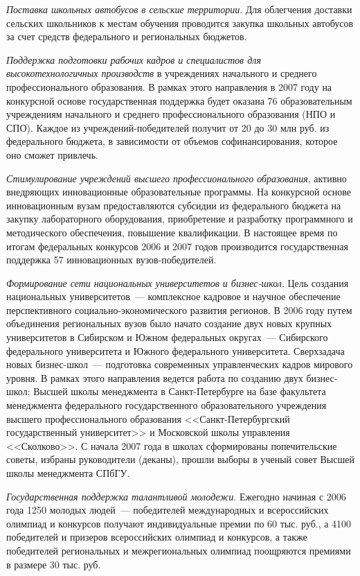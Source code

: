 \documentclass[article, 12pt, russian, oneside]{ncc}
\begin{document}
\emph{Поставка школьных автобусов в сельские территории}. Для
облегчения доставки сельских школьников к местам обучения проводится
закупка школьных автобусов за счет средств федерального и региональных
бюджетов.

\emph{Поддержка подготовки рабочих кадров и специалистов для
  высокотехнологичных производств} в учреждениях начального и среднего
профессионального образования. В рамках этого направления в 2007 году
на конкурсной основе государственная поддержка будет оказана 76
образовательным учреждениям начального и среднего профессионального
образования (НПО и СПО). Каждое из учреждений-победителей получит от
20 до 30 млн руб. из федерального бюджета, в зависимости от объемов
софинансирования, которое оно сможет привлечь.

\emph{Стимулирование учреждений высшего профессионального
  образования}, активно внедряющих инновационные образовательные
программы. На конкурсной основе инновационным вузам предоставляются
субсидии из федерального бюджета на закупку лабораторного
оборудования, приобретение и разработку программного и методического
обеспечения, повышение квалификации. В настоящее время по итогам
федеральных конкурсов 2006 и 2007 годов производится государственная
поддержка 57 инновационных вузов-победителей.

\emph{Формирование сети национальных университетов и
  бизнес-школ}. Цель создания национальных университетов~---
комплексное кадровое и научное обеспечение перспективного
социально-экономического развития регионов. В 2006 году путем
объединения региональных вузов было начато создание двух новых крупных
университетов в Сибирском и Южном федеральных округах~--- Сибирского
федерального университета и Южного федерального
университета. Сверхзадача новых бизнес-школ~--- подготовка современных
управленческих кадров мирового уровня. В рамках этого направления
ведется работа по созданию двух бизнес-школ: Высшей школы менеджмента
в Санкт-Петербурге на базе факультета менеджмента федерального
государственного образовательного учреждения высшего профессионального
образования <<Санкт-Петербургский государственный университет>> и
Московской школы управления <<Сколково>>. С начала 2007 года в школах
сформированы попечительские советы, избраны руководители (деканы),
прошли выборы в ученый совет Высшей школы менеджмента СПбГУ.

\emph{Государственная поддержка талантливой молодежи}. Ежегодно
начиная с 2006 года 1250 молодых людей~--- победителей международных и
всероссийских олимпиад и конкурсов получают индивидуальные премии по
60 тыс. руб., а 4100 победителей и призеров всероссийских олимпиад и
конкурсов, а также победителей региональных и межрегиональных олимпиад
поощряются премиями в размере 30 тыс. руб.
\end{document}

